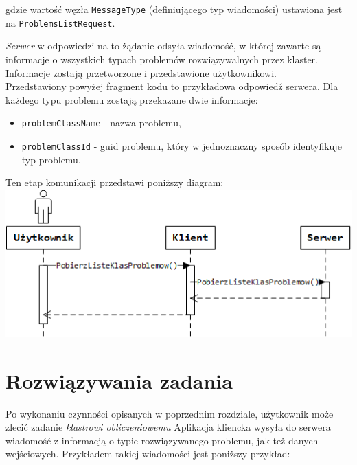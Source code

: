 \documentclass[12pt,a4paper,titlepage]{report}
\begin{document}
	 
	gdzie wartość węzła \verb+MessageType+ (definiującego typ wiadomości) ustawiona jest na \verb+ProblemsListRequest+.  	

	
    \textit{Serwer} w odpowiedzi na to żądanie odsyła wiadomość, w której zawarte są informacje o wszystkich typach problemów rozwiązywalnych przez klaster. Informacje zostają przetworzone i przedstawione użytkownikowi.\\
	
	Przedstawiony powyżej fragment kodu to przykładowa odpowiedź serwera. Dla każdego typu problemu zostają przekazane dwie informacje:
	\begin{itemize}
	\item \verb+problemClassName+ - nazwa problemu,
	\item \verb+problemClassId+ - guid problemu, który w jednoznaczny sposób identyfikuje typ problemu.
	
	\end{itemize}   
	
	Ten etap komunikacji przedstawi poniższy diagram:\\
	
	\includegraphics[width=\textwidth]{img/communication/problemclass.png}
    
    \section{Rozwiązywania zadania}
    Po wykonaniu czynności opisanych w poprzednim rozdziale, użytkownik może zlecić zadanie \textit{klastrowi obliczeniowemu}
    Aplikacja kliencka wysyła do serwera wiadomość z informacją o typie rozwiązywanego problemu, jak też danych wejściowych.
    Przykładem takiej wiadomości jest poniższy przykład: \\
    
    
    
\end{document}

